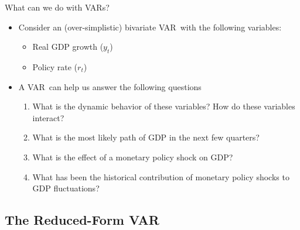\documentclass[10pt,handout]{beamer}
\begin{document}
\begin{frame}
{What can we do with VARs?}
\begin{itemize}
\item Consider an (over-simplistic) bivariate VAR\ with the following variables: \smallskip
\begin{itemize}
\item Real GDP growth ($y_{t}$) \smallskip
\item Policy rate ($r_{t}$)\bigskip \medskip \pause \medskip
\end{itemize}
\item A VAR\ can help us answer the following questions\smallskip
\begin{enumerate}
\item[{[1]}] What is the dynamic behavior of these variables? How do these variables interact?\medskip
\item[{[2]}] What is the most likely path of GDP in the next few quarters? \medskip
\item[{[3]}] What is the effect of a monetary policy shock on GDP?\medskip
\item[{[4]}] What has been the historical contribution of monetary policy shocks to GDP fluctuations?
\end{enumerate}
\end{itemize}
\end{frame}
\shownotesblock{}

\subsection{The Reduced-Form VAR}
\begin{frame}
\color{title}  \par\bigskip
\color{note} 
\end{frame}
\shownotesblock{}
\end{document}
